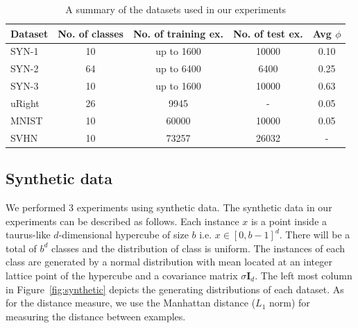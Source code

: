 \documentclass{article}
\begin{document}
\begin{table}[tb]
\caption{A summary of the datasets used in our experiments}
\label{table:results}
\vskip 0.15in
\begin{center}
\begin{small}
\begin{sc}
\begin{tabular}{lcccc}
  \hline
  \abovespace\belowspace
  Dataset & No. of classes & No. of training ex. & No. of test
  ex. & Avg $\phi$ \\
  \hline
  \abovespace
  SYN-1 & 10 & up to 1600 & 10000 & 0.10\\
  SYN-2 & 64 & up to 6400 & 6400 & 0.25\\
  \belowspace
  SYN-3 & 10 & up to 1600 & 10000 & 0.63\\
  \hline
  \abovespace
  uRight & 26 & 9945 & -  & 0.05\\
  MNIST & 10 & 60000 & 10000 & 0.05 \\
  \belowspace
  SVHN & 10 & 73257 & 26032 &-\\
  \hline
\end{tabular}
\end{sc}
\end{small}
\end{center}
\vskip -0.1in
\end{table}

\subsection{Synthetic data}
We performed 3 experiments using synthetic data. The synthetic data in
our experiments can be described as follows. Each instance $x$ is a
point inside a taurus-like $d$-dimensional hypercube of size $b$
i.e. $x \in [0,b-1]^d$. There will be a total of $b^d$ classes and the
distribution of class is uniform. The instances of each class are
generated by a normal distribution with mean located at an integer
lattice point of the hypercube and a covariance matrix $\sigma
\mathbf{I}_d$. The left most column in Figure~\ref{fig:synthetic}
depicts the generating distributions of each dataset. As for the
distance measure, we use the Manhattan distance ($L_1$ norm) for
measuring the distance between examples.
\end{document}
